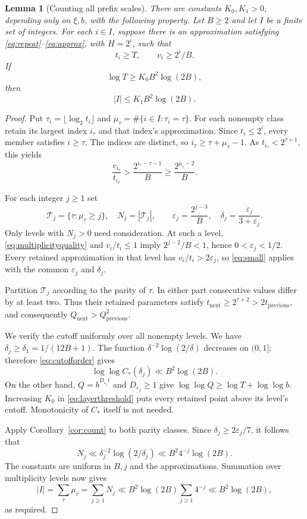 \documentclass[11pt]{article}
\numberwithin{equation}{section}
\newtheorem{lemma}[theorem]{Lemma}
\theoremstyle{remark}\newtheorem{remark}[theorem]{Remark}
\newcommand{\eps}{\varepsilon}\newcommand{\LL}{\mathcal L}
\begin{document}
\begin{lemma}[Counting all prefix scales]\label{lem:layers}
There are constants $K_0,K_1>0$, depending only on $\xi,b$, with the
following property. Let $B\ge2$ and let $I$ be a finite set of integers.
For each $i\in I$, suppose there is an approximation satisfying
\eqref{eq:repeat}--\eqref{eq:approx}, with $H=2^i$, such that
\[
 t_i\ge T,\qquad v_i\ge2^i/B.
\]
If
\begin{equation}\label{eq:layerthreshold}
 \log T\ge K_0B^2\log(2B),
\end{equation}
then
\begin{equation}\label{eq:layercount}
 |I|\le K_1B^2\log(2B).
\end{equation}
\end{lemma}
\begin{proof}
Put $\tau_i=\lfloor\log_2t_i\rfloor$ and
$\mu_\tau=\#\{i\in I:\tau_i=\tau\}$.
For each nonempty class retain its largest index $i_\tau$ and that
index's approximation. Since $t_i\le2^i$, every member satisfies
$i\ge\tau$. The indices are distinct, so
$i_\tau\ge\tau+\mu_\tau-1$. As $t_{i_\tau}<2^{\tau+1}$, this yields
\begin{equation}\label{eq:multiplicityquality}
 \frac{v_{i_\tau}}{t_{i_\tau}}
 >\frac{2^{i_\tau-\tau-1}}B
 \ge\frac{2^{\mu_\tau-2}}B.
\end{equation}

For each integer $j\ge1$ set
\[
 \mathcal T_j=\{\tau:\mu_\tau\ge j\},\quad N_j=|\mathcal T_j|,
 \qquad \eps_j=\frac{2^{j-3}}B,\quad
 \delta_j=\frac{\eps_j}{3+\eps_j}.
\]
Only levels with $N_j>0$ need consideration. At such a level,
\eqref{eq:multiplicityquality} and $v_i/t_i\le1$ imply
$2^{j-2}/B<1$, hence $0<\eps_j<1/2$.
Every retained approximation in that level has $v_i/t_i>2\eps_j$,
so \eqref{eq:small} applies with the common $\eps_j$ and $\delta_j$.

Partition $\mathcal T_j$ according to the parity of $\tau$.
In either part consecutive values differ by at least two. Thus their
retained parameters satisfy
$t_{\mathrm{next}}\ge2^{\tau+2}>2t_{\mathrm{previous}}$,
and consequently $Q_{\mathrm{next}}>Q_{\mathrm{previous}}^2$.

We verify the cutoff uniformly over all nonempty levels.
We have $\delta_j\ge\delta_1=1/(12B+1)$.
The function $\delta^{-2}\log(2/\delta)$ decreases on $(0,1]$;
therefore \eqref{eq:cutofforder} gives
\[
 \log\log C_*(\delta_j)\ll B^2\log(2B).
\]
On the other hand, $Q=b^{D_{\eps_j}t}$ and $D_{\eps_j}\ge1$ give
$\log\log Q\ge\log T+\log\log b$.
Increasing $K_0$ in \eqref{eq:layerthreshold} puts every retained
point above its level's cutoff. Monotonicity of $C_*$ itself is not needed.

Apply Corollary~\ref{cor:count} to both parity classes. Since
$\delta_j\ge2\eps_j/7$, it follows that
\begin{equation}\label{eq:tailcount}
 N_j\ll\delta_j^{-2}\log(2/\delta_j)
 \ll B^2 4^{-j}\log(2B).
\end{equation}
The constants are uniform in $B,j$ and the approximations.
Summation over multiplicity levels now gives
\[
 |I|=\sum_\tau\mu_\tau=\sum_{j\ge1}N_j
 \ll B^2\log(2B)\sum_{j\ge1}4^{-j}
 \ll B^2\log(2B),
\]
as required.
\end{proof}
\end{document}
